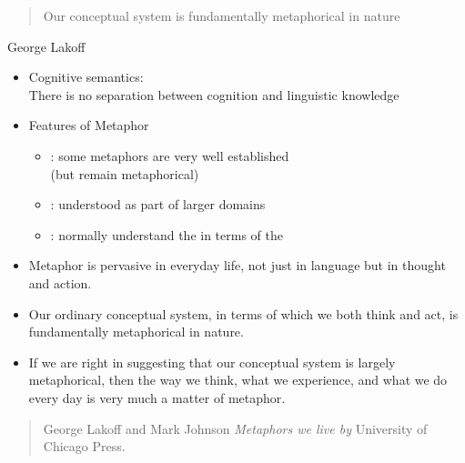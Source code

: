 \documentclass[a4paper,landscape,headrule,footrule,xetex]{foils}
\begin{document}

\begin{quote}
  \Large Our conceptual system is fundamentally
metaphorical in nature
\end{quote}
\begin{flushright}
  George Lakoff
\end{flushright}

\begin{itemize}
\item Cognitive semantics:
\\ There is no separation between cognition and
linguistic knowledge
\item Features of Metaphor
\begin{itemize}
\item {}: some metaphors are very well established 
\\ (but remain metaphorical)
\item {}: understood as part of larger domains
\item {}: normally understand the  
  in terms of the 
\end{itemize}

\end{itemize}



\begin{itemize}
\item Metaphor is pervasive in everyday life, not just in
language but in thought and action.
\item Our ordinary conceptual system, in terms of which we
both think and act, is fundamentally metaphorical in
nature.
\item If we are right in suggesting that our conceptual system
is largely metaphorical, then the way we think, what we
experience, and what we do every day is very much a
matter of metaphor.
\end{itemize}

\begin{quote}
  George Lakoff and Mark Johnson \citeyear{Lakoff:Johnson:1980} \textit{Metaphors we live by} 
  University of Chicago Press.
\end{quote}
\end{document}
